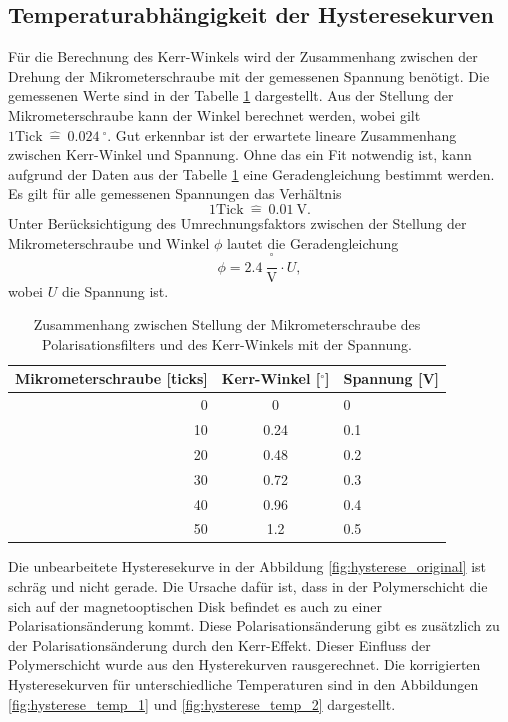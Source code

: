 \subsection{Temperaturabhängigkeit der Hysteresekurven}
Für die Berechnung des Kerr-Winkels wird der Zusammenhang zwischen der Drehung der Mikrometerschraube mit der gemessenen Spannung benötigt. Die gemessenen Werte sind in der Tabelle \ref{tab:Mikrometerschraube} dargestellt. Aus der Stellung der Mikrometerschraube kann der Winkel berechnet werden, wobei gilt $ 1 \mathrm{Tick}\ \widehat{=}\ 0.024\ {}^\circ$. Gut erkennbar ist der erwartete lineare Zusammenhang zwischen Kerr-Winkel und Spannung. Ohne das ein Fit notwendig ist, kann aufgrund der Daten aus der Tabelle \ref{tab:Mikrometerschraube} eine Geradengleichung bestimmt werden. Es gilt für alle gemessenen Spannungen das Verhältnis
\begin{equation}
1 \mathrm{Tick}\ \widehat{=}\ 0.01\ \mathrm{V}.
\end{equation}
Unter Berücksichtigung des Umrechnungsfaktors zwischen der Stellung der Mikrometerschraube und Winkel $\phi$ lautet die Geradengleichung 
\begin{equation}
\phi = 2.4\ \frac{{ }^\circ}{\mathrm{V}} \cdot U,
\end{equation}
wobei $U$ die Spannung ist. 

\begin{table}[h]
    \centering
    \caption{
        Zusammenhang zwischen Stellung der Mikrometerschraube des Polarisationsfilters und  des Kerr-Winkels mit der Spannung.
        }
    \label{tab:Mikrometerschraube}
    \begin{tabular}{r|c|l}
    Mikrometerschraube [ticks] & Kerr-Winkel [${}^\circ$]& Spannung [V] \\\hline
    0  & 0 & 0
 \\
    10 & 0.24 & 0.1
 \\
    20 & 0.48 & 0.2
 \\
    30 & 0.72 & 0.3
 \\
    40 & 0.96 & 0.4
 \\
    50 & 1.2 & 0.5 \\   
    \end{tabular}
\end{table}
Die unbearbeitete Hysteresekurve in der Abbildung \ref{fig:hysterese_original} ist schräg und nicht gerade. 
Die Ursache dafür ist, dass in der Polymerschicht die sich auf der magnetooptischen Disk befindet es auch zu einer Polarisationsänderung kommt. 
Diese Polarisationsänderung gibt es zusätzlich zu der Polarisationsänderung durch den Kerr-Effekt. 
Dieser Einfluss der Polymerschicht wurde aus den Hysterekurven rausgerechnet. 
Die korrigierten Hysteresekurven für unterschiedliche Temperaturen  sind in den Abbildungen \ref{fig:hysterese_temp_1} und \ref{fig:hysterese_temp_2} dargestellt. 


